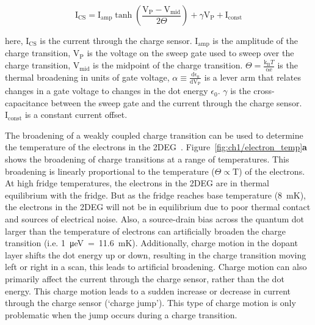 \begin{equation}\label{eq:cs_lineshape}
 \mathrm{I_{CS}} = 
 \mathrm{I_{amp}}
 \tanh
 \left( 
 \frac{\mathrm{V_P - V_{mid}}}{2\Theta}
 \right) + 
 \gamma \mathrm{V_P}
 + \mathrm{I_{const}}
\end{equation}

\noindent here, $\mathrm{I_{CS}}$ is the current through the charge sensor. $\mathrm{I_{amp}}$ is the amplitude of the charge transition, $\mathrm{V_{P}}$ is the voltage on the sweep gate used to sweep over the charge transition, $\mathrm{V_{mid}}$ is the midpoint of the charge transition. $\Theta=\frac{\mathrm{k_B}T}{\mathrm{\alpha e}}$ is the thermal broadening in units of gate voltage, $\alpha \equiv \frac{\mathrm{d\epsilon_0}}{\mathrm{dV_P}}$ is a lever arm that relates changes in a gate voltage to changes in the dot energy $\epsilon_0$. $\gamma$ is the cross-capacitance between the sweep gate and the current through the charge sensor. $\mathrm{I_{const}}$ is a constant current offset.



The broadening of a weakly coupled charge transition can be used to determine the temperature of the electrons in the 2DEG~\cite{cs_measure_temp}. Figure~\ref{fig:ch1/electron_temp}\textbf{a} shows the broadening of charge transitions at a range of temperatures. This broadening is linearly proportional to the temperature ($\Theta\propto\mathrm{T}$) of the electrons. At high fridge temperatures, the electrons in the 2DEG are in thermal equilibrium with the fridge. But as the fridge reaches base temperature (\qty{8}{mK}), the electrons in the 2DEG will not be in equilibrium due to poor thermal contact and sources of electrical noise. Also, a source-drain bias across the quantum dot larger than the temperature of electrons can artificially broaden the charge transition (i.e. \qty{1}{\micro eV}~=~\qty{11.6}{mK}). Additionally, charge motion in the dopant layer shifts the dot energy up or down, resulting in the charge transition moving left or right in a scan, this leads to artificial broadening. Charge motion can also primarily affect the current through the charge sensor, rather than the dot energy. This charge motion leads to a sudden increase or decrease in current through the charge sensor (`charge jump'). This type of charge motion is only problematic when the jump occurs during a charge transition.


